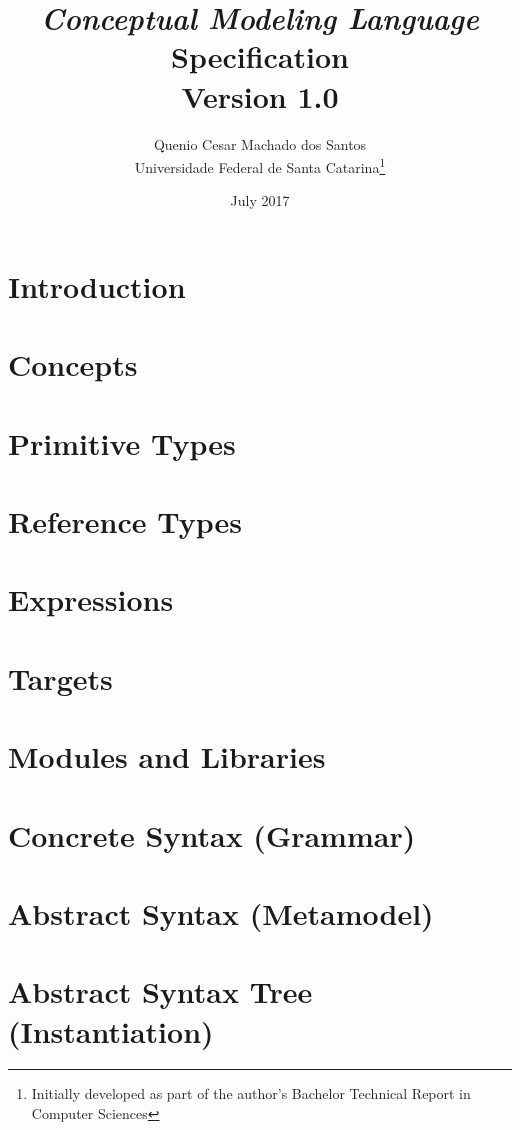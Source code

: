 \documentclass[a4paper,oneside,14pt, extrafontsizes]{memoir}
\title{\emph{Conceptual Modeling Language}\\Specification\\ \small{Version 1.0}}
\author{Quenio Cesar Machado dos Santos\\
\small{Universidade Federal de Santa Catarina}\thanks{
Initially developed as part of the author's Bachelor Technical Report in Computer Sciences}}
\date{July 2017}
\begin{document}
\begin{titlingpage}
\maketitle
\end{titlingpage}

\frontmatter

\begin{KeepFromToc}

\clearpage
\tableofcontents

\clearpage
\listoffigures

\clearpage
\listoftables 

\end{KeepFromToc}

\mainmatter

\chapter{Introduction}

\chapter{Concepts}

\chapter{Primitive Types}

\chapter{Reference Types}

\chapter{Expressions}

\chapter{Targets}

\chapter{Modules and Libraries}

\appendix

\chapter{Concrete Syntax (Grammar)}



\chapter{Abstract Syntax (Metamodel)}



\chapter{Abstract Syntax Tree (Instantiation)}



\backmatter
\end{document}
